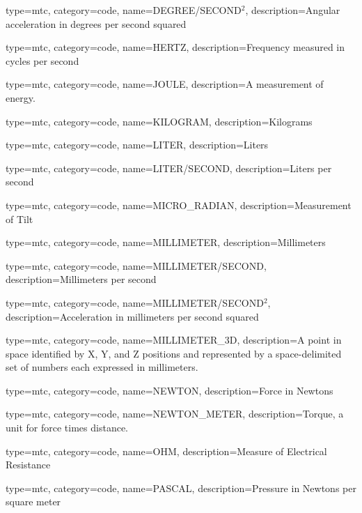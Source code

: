 {
  type=mtc,
  category=code,
  name={DEGREE/SECOND$^2$},
  description={Angular acceleration in degrees per second squared}
}

{
  type=mtc,
  category=code,
  name={HERTZ},
  description={Frequency measured in cycles per second}
}

{
  type=mtc,
  category=code,
  name={JOULE},
  description={A measurement of energy.}
}

{
  type=mtc,
  category=code,
  name={KILOGRAM},
  description={Kilograms}
}

{
  type=mtc,
  category=code,
  name={LITER},
  description={Liters}
}

{
  type=mtc,
  category=code,
  name={LITER/SECOND},
  description={Liters per second}
}

{
  type=mtc,
  category=code,
  name={MICRO\_RADIAN},
  description={Measurement of Tilt}
}

{
  type=mtc,
  category=code,
  name={MILLIMETER},
  description={Millimeters}
}

{
  type=mtc,
  category=code,
  name={MILLIMETER/SECOND},
  description={Millimeters per second}
}

{
  type=mtc,
  category=code,
  name={MILLIMETER/SECOND$^2$},
  description={Acceleration in millimeters per second squared}
}

{
  type=mtc,
  category=code,
  name={MILLIMETER\_3D},
  description={A point in space identified by X, Y, and Z positions and represented by a space-delimited set of numbers each expressed in millimeters.}
}

{
  type=mtc,
  category=code,
  name={NEWTON},
  description={Force in Newtons}
}

{
  type=mtc,
  category=code,
  name={NEWTON\_METER},
  description={Torque, a unit for force times distance.}
}

{
  type=mtc,
  category=code,
  name={OHM},
  description={Measure of Electrical Resistance}
}

{
  type=mtc,
  category=code,
  name={PASCAL},
  description={Pressure in Newtons per square meter}
}

